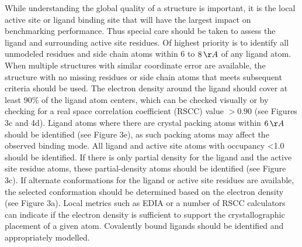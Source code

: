 \documentclass[9pt,bestpractices]{livecoms}
\begin{document}
While understanding the global quality of a structure is important, it is the local active site or ligand binding site that will have the largest impact on benchmarking performance. Thus special care should be taken to assess the ligand and surrounding active site residues. 
%
Of highest priority is to identify all unmodeled residues and side chain atoms within 6 to $8\,\AA$  of any ligand atom. When multiple structures with similar coordinate error are available, the structure with no missing residues or side chain atoms that meets subsequent criteria should be used.
%
The electron density around the ligand should cover at least 90\% of the ligand atom centers, which can be checked visually or by checking for a real space correlation coefficient (RSCC) value $>0.90$ (see Figures 3c and 4d). Ligand atoms where there are crystal packing atoms within $6\,\AA$ should be identified (see Figure 3e), as such packing atoms may affect the observed binding mode. 
%
All ligand and active site atoms with occupancy <1.0 should be identified.
%
If there is only partial density for the ligand and the active site residue atoms, these partial-density atoms should be identified (see Figure 3c). If alternate conformations for the ligand or active site residues are available, the selected conformation should be determined based on the electron density (see Figure 3a). Local metrics such as EDIA or a number of RSCC calculators can indicate if the electron density is sufficient to support the crystallographic placement of a given atom.
%
Covalently bound ligands should be identified and appropriately modelled.
\end{document}
